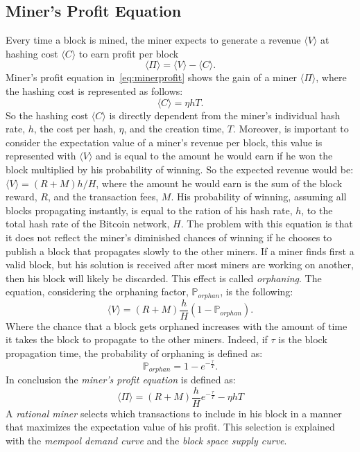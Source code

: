 \documentclass[USenglish]{uit-thesis}
\begin{document}
\subsection{Miner's Profit Equation}
Every time a block is mined, the miner expects to generate a revenue $\langle V \rangle$
at hashing cost $\langle C \rangle$ to earn profit per block
\begin{equation}
\label{eq:minerprofit}
\langle \Pi \rangle = \langle V\rangle - \langle C\rangle.
\end{equation}
Miner's profit equation in~\ref{eq:minerprofit} shows the gain of a miner $\langle \Pi \rangle$,
where the hashing cost is represented as follows:
\begin{equation}
\label{eq:hashingcost}
\langle C\rangle = \eta hT.
\end{equation}
So the hashing cost $\langle C\rangle$ is directly dependent from the miner's individual hash rate, $h$,
the cost per hash, $\eta$, and the creation time, $T$. Moreover, is important to consider the
expectation value of a miner's revenue per block, this value is represented with $\langle V\rangle$
and is equal to the amount he would earn if he won the block multiplied by his probability of
winning. So the expected revenue would be:
$\langle V\rangle = (R + M) h/H$,
where the amount he would earn is the sum of the block reward, $R$, and the transaction fees, $M$.
His probability of winning, assuming all blocks propagating instantly, is equal to the ration of his hash
rate, $h$, to the total hash rate of the Bitcoin network, $H$. The problem with this equation is that it
does not reflect the miner's diminished chances of winning if he chooses to publish a block that propagates
slowly to the other miners. If a miner finds first a valid block, but his solution is received after most miners
are working on another, then his block will likely be discarded. This effect is called \emph{orphaning}. The
equation, considering the orphaning factor, $\mathbb{P}_{orphan}$, is the following:
\begin{equation}
\label{eq:expectedrevenue}
\langle V\rangle = \left(R + M\right)\frac{h}{H}\left(1 - \mathbb{P}_{orphan}\right).
\end{equation}
Where the chance that a block gets orphaned increases with the amount of time it takes the
block to propagate to the other miners. Indeed, if $\tau$ is the block propagation time, the
probability of orphaning is defined as:
\begin{equation}
\label{eq:orphaning}
\mathbb{P}_{orphan} = 1 - e^{-\frac{\tau}{T}}.
\end{equation}
In conclusion the \emph{miner's profit equation} is defined as:
\begin{equation}
\label{eq:minerprofiteq}
\langle \Pi \rangle = (R + M)\frac{h}{H} e^{-\frac{\tau}{T}} -\eta hT
\end{equation}
A \emph{rational miner} selects which transactions to include in his block in a manner that maximizes
the expectation value of his profit. This selection is explained with the \emph{mempool demand curve}
and the \emph{block space supply curve}.
\end{document}

